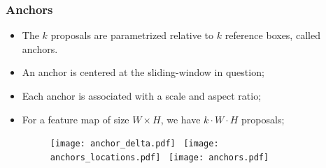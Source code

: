 \documentclass{beamer}
\begin{document}

			\begin{frame}\frametitle{Anchors}
				\begin{itemize}
					\item The $k$ proposals are parametrized relative to $k$ reference boxes, called anchors.
					\item An anchor is centered at the sliding-window in question;
					\item Each anchor is associated with a scale and aspect ratio;
					\item For a feature map of size $W\times H$, we have $k \cdot W \cdot H$ proposals;
					\begin{figure}
						\texttt{[image: anchor\_delta.pdf]}~
						\texttt{[image: anchors\_locations.pdf]}~
						\texttt{[image: anchors.pdf]}
					\end{figure}
				\end{itemize}
			\end{frame}
\end{document}
